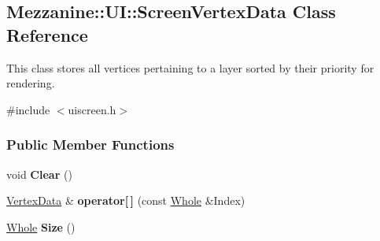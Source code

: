 \hypertarget{classMezzanine_1_1UI_1_1ScreenVertexData}{
\subsection{Mezzanine::UI::ScreenVertexData Class Reference}
\label{classMezzanine_1_1UI_1_1ScreenVertexData}
}


This class stores all vertices pertaining to a layer sorted by their priority for rendering.  




{\ttfamily \#include $<$uiscreen.h$>$}

\subsubsection*{Public Member Functions}
\begin{DoxyCompactItemize}
\item 
\hypertarget{classMezzanine_1_1UI_1_1ScreenVertexData_a34cfc9d242901f560ac9cd11bdf602e3}{
void {\bfseries Clear} ()}
\label{classMezzanine_1_1UI_1_1ScreenVertexData_a34cfc9d242901f560ac9cd11bdf602e3}

\item 
\hypertarget{classMezzanine_1_1UI_1_1ScreenVertexData_a8552eda53845071bc5bc733683a32cd1}{
\hyperlink{structMezzanine_1_1UI_1_1VertexData}{VertexData} \& {\bfseries operator\mbox{[}$\,$\mbox{]}} (const \hyperlink{namespaceMezzanine_adcbb6ce6d1eb4379d109e51171e2e493}{Whole} \&Index)}
\label{classMezzanine_1_1UI_1_1ScreenVertexData_a8552eda53845071bc5bc733683a32cd1}

\item 
\hypertarget{classMezzanine_1_1UI_1_1ScreenVertexData_a39876f0f34f9e1ca32f86ec6e40d5917}{
\hyperlink{namespaceMezzanine_adcbb6ce6d1eb4379d109e51171e2e493}{Whole} {\bfseries Size} ()}
\label{classMezzanine_1_1UI_1_1ScreenVertexData_a39876f0f34f9e1ca32f86ec6e40d5917}

\end{DoxyCompactItemize}
